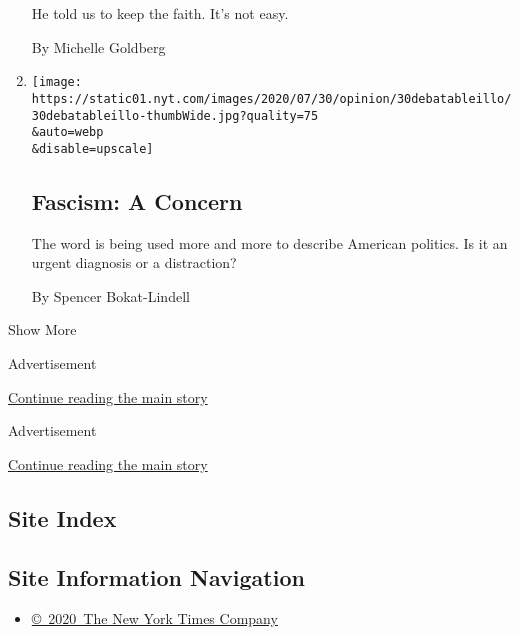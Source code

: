 \begin{enumerate}
  He told us to keep the faith. It's not easy.

  By Michelle Goldberg
\item
  \href{/2020/07/30/opinion/fascism-us.html}{}

  \texttt{[image: https://static01.nyt.com/images/2020/07/30/opinion/30debatableillo/30debatableillo-thumbWide.jpg?quality=75\\\&auto=webp\\\&disable=upscale]}

  \hypertarget{fascism-a-concern}{%
  \subsection{Fascism: A Concern}\label{fascism-a-concern}}

  The word is being used more and more to describe American politics. Is
  it an urgent diagnosis or a distraction?

  By Spencer Bokat-Lindell
\end{enumerate}

Show More

Advertisement

\protect\hyperlink{after-mid1}{Continue reading the main story}

Advertisement

\protect\hyperlink{after-mktg}{Continue reading the main story}

\hypertarget{site-index}{%
\subsection{Site Index}\label{site-index}}

\hypertarget{site-information-navigation}{%
\subsection{Site Information
Navigation}\label{site-information-navigation}}

\begin{itemize}
\tightlist
\item
  \href{https://help.nytimes.com/hc/en-us/articles/115014792127-Copyright-notice}{©~2020~The
  New York Times Company}
\end{itemize}

